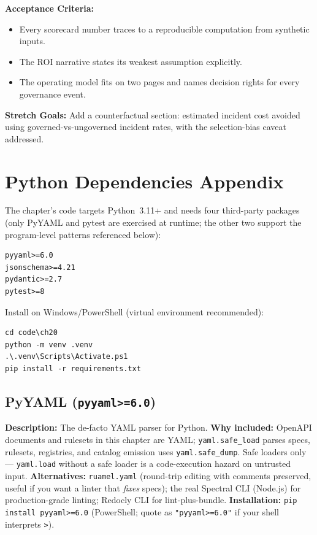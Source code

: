 \textbf{Acceptance Criteria:}
\begin{itemize}
  \item[$\square$] Every scorecard number traces to a reproducible
        computation from synthetic inputs.
  \item[$\square$] The ROI narrative states its weakest assumption
        explicitly.
  \item[$\square$] The operating model fits on two pages and names
        decision rights for every governance event.
\end{itemize}

\textbf{Stretch Goals:} Add a counterfactual section: estimated incident
cost avoided using governed-vs-ungoverned incident rates, with the
selection-bias caveat addressed.

\section{Python Dependencies Appendix}
\label{sec:ch20-dependencies}

The chapter's code targets Python~3.11+ and needs four third-party
packages (only PyYAML and pytest are exercised at runtime; the other two
support the program-level patterns referenced below):

\begin{verbatim}
pyyaml>=6.0
jsonschema>=4.21
pydantic>=2.7
pytest>=8
\end{verbatim}

Install on Windows/PowerShell (virtual environment recommended):

\begin{verbatim}
cd code\ch20
python -m venv .venv
.\.venv\Scripts\Activate.ps1
pip install -r requirements.txt
\end{verbatim}

\subsection{PyYAML (\texttt{pyyaml>=6.0})}
\textbf{Description:} The de-facto YAML parser for Python.
\textbf{Why included:} OpenAPI documents and rulesets in this chapter are
YAML; \texttt{yaml.safe\_load} parses specs, rulesets, registries, and
catalog emission uses \texttt{yaml.safe\_dump}. Safe loaders only ---
\texttt{yaml.load} without a safe loader is a code-execution hazard on
untrusted input.
\textbf{Alternatives:} \texttt{ruamel.yaml} (round-trip editing with
comments preserved, useful if you want a linter that \emph{fixes} specs);
the real Spectral CLI (Node.js) for production-grade linting; Redocly CLI
for lint-plus-bundle.
\textbf{Installation:} \texttt{pip install pyyaml>=6.0} (PowerShell;
quote as \texttt{"pyyaml>=6.0"} if your shell interprets \texttt{>}).


